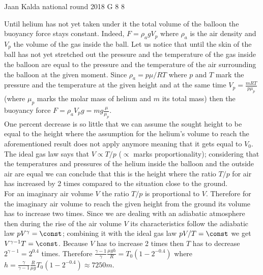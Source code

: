 \documentclass[11pt]{article}
\begin{document}
{Jaan Kalda} %
{national round} %
{2018} %
{G 8} %
{8} %
{

\ifEngSolution
Until helium has not yet taken under it the total volume of the balloon the buoyancy force stays constant. Indeed, $F=\rho_a g V_p$ where $\rho_a$ is the air density and $V_p$ the volume of the gas inside the ball. Let us notice that until the skin of the ball has not yet stretched out the pressure and the temperature of the gas inside the balloon are equal to the pressure and the temperature of the air surrounding the balloon at the given moment. Since $\rho_a=p\mu/RT$ where $p$ and $T$ mark the pressure and the temperature at the given height and at the same time $V_p=\frac {mRT}{p\mu_p}$ (where $\mu_p$ marks the molar mass of helium and $m$ its total mass) then the buoyancy force $F=\rho_a V_p g=mg\frac{\mu}{\mu_p}$.\\
One percent decrease is so little that we can assume the sought height to be equal to the height where the assumption for the helium’s volume to reach the aforementioned result does not apply anymore meaning that it gets equal to $V_0$. The ideal gas law says that $V\propto T/p$ ($\propto$ marks proportionality); considering that the temperatures and pressures of the helium inside the balloon and the outside air are equal we can conclude that this is the height where the ratio $T/p$ for air has increased by 2 times compared to the situation close to the ground.\\
For an imaginary air volume $V$ the ratio $T/p$ is proportional to $V$. Therefore for the imaginary air volume to reach the given height from the ground its volume has to increase two times. Since we are dealing with an adiabatic atmosphere then during the rise of the air volume $V$ its characteristics follow the adiabatic law $pV^\gamma=\const$; combining it with the ideal gas law $pV/T=\const$ we get $V^{\gamma-1}T=\const$. Because $V$ has to increase 2 times then $T$ has to decrease $2^{\gamma-1}=2^{0.4}$ times. Therefore $\frac{\gamma-1}\gamma\frac{\mu g h}R =T_0(1-2^{-0.4})$ where $h=\frac\gamma{\gamma-1}\frac R{\mu g}T_0(1-2^{-0.4})\approx\SI{7250}m$.
\fi
}
\end{document}
